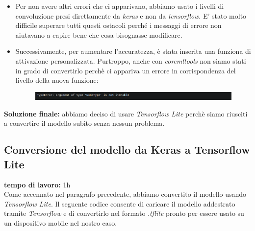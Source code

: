\begin{itemize}
	
	\item Per non avere altri errori che ci apparivano, abbiamo usato i livelli di convoluzione presi direttamente da \textit{keras} e non da \textit{tensorflow}. E' stato molto difficile superare tutti questi ostacoli perché i messaggi di errore non aiutavano a capire bene che cosa bisognasse modificare.
	
	\item Successivamente, per aumentare l'accuratezza, è stata inserita una funziona di attivazione personalizzata. Purtroppo, anche con \textit{coremltools} non siamo stati in grado di convertirlo perchè ci appariva un errore in corrispondenza del livello della nuova funzione:
	
	\begin{figure}[H]
		\centering
		\includegraphics[scale=0.60]{./images/img11.png}
	\end{figure}
	
\end{itemize}
\textbf{Soluzione finale:} abbiamo deciso di usare \textit{Tensorflow Lite} perchè siamo riusciti a convertire il modello subito senza nessun problema.

\subsection{Conversione del modello da Keras a Tensorflow Lite}
\textbf{tempo di lavoro:} 1h\\
\newline
Come accennato nel paragrafo precedente, abbiamo convertito il modello usando \textit{Tensorflow Lite}.
Il seguente codice consente di caricare il modello addestrato tramite \textit{Tensorflow} e di convertirlo nel formato .\textit{tflite} pronto per essere usato su un dispositivo mobile nel nostro caso.

